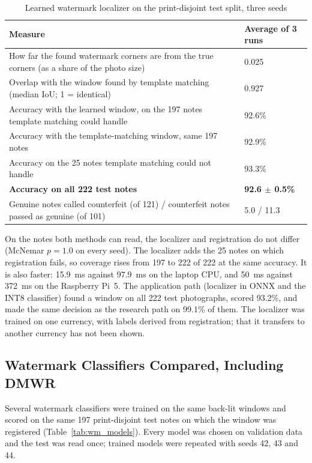 \begin{table}[!htbp]
\centering
\caption{Learned watermark localizer on the print-disjoint test split, three seeds}
\label{tab:localizer}
\begin{tabular}{|L{10.4cm}|C{3.0cm}|}
\hline
\textbf{Measure} & \textbf{Average of 3 runs} \\ \hline
How far the found watermark corners are from the true corners (as a share of the photo size) & 0.025 \\ \hline
Overlap with the window found by template matching (median IoU; 1 = identical) & 0.927 \\ \hline
Accuracy with the learned window, on the 197 notes template matching could handle & 92.6\% \\ \hline
Accuracy with the template-matching window, same 197 notes & 92.9\% \\ \hline
Accuracy on the 25 notes template matching could not handle & 93.3\% \\ \hline
\textbf{Accuracy on all 222 test notes} & \textbf{92.6 $\pm$ 0.5\%} \\ \hline
Genuine notes called counterfeit (of 121) / counterfeit notes passed as genuine (of 101) & 5.0 / 11.3 \\ \hline
\end{tabular}
\end{table}

On the notes both methods can read, the localizer and registration do not differ (McNemar $p = 1.0$ on every seed). The localizer adds the 25 notes on which registration fails, so coverage rises from 197 to 222 of 222 at the same accuracy. It is also faster: 15.9~ms against 97.9~ms on the laptop CPU, and 50~ms against 372~ms on the Raspberry Pi~5. The application path (localizer in ONNX and the INT8 classifier) found a window on all 222 test photographs, scored 93.2\%, and made the same decision as the research path on 99.1\% of them. The localizer was trained on one currency, with labels derived from registration; that it transfers to another currency has not been shown.


\subsection{Watermark Classifiers Compared, Including DMWR}
\label{sec:dmwr_results}
Several watermark classifiers were trained on the same back-lit windows and scored on the same 197 print-disjoint test notes on which the window was registered (Table~\ref{tab:wm_models}). Every model was chosen on validation data and the test was read once; trained models were repeated with seeds 42, 43 and 44.

